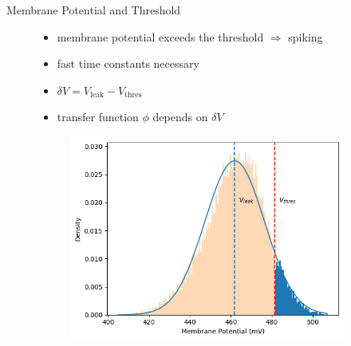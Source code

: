\documentclass[12pt, aspectratio=169]{beamer}
\begin{document}
\begin{frame}{Membrane Potential and Threshold}
    \begin{figure}[!htb]
            \begin{itemize}
                \item membrane potential exceeds the threshold $\Rightarrow$ spiking
                \item fast time constants necessary
                \item $\delta V = V_{\text{leak}} - V_{\text{thres}}$
                \item transfer function $\phi$ depends on $\delta V$
            \end{itemize}
      	\endminipage\hfill
      	    \centering
      	    \vspace{20pt}
            \begin{figure}
                \includegraphics[scale=0.5]{activation_function_vmem_distr_with_thres.png}
                \label{membrane_potential}
            \end{figure}
        \endminipage\hfill
    \end{figure}
\end{frame}
\end{document}
